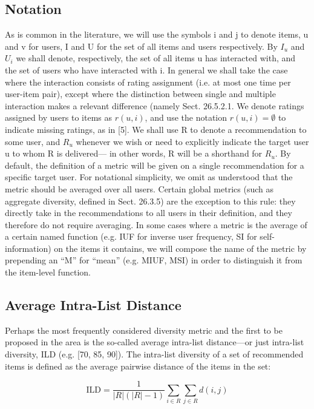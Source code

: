 \subsection{Notation}

As is common in the literature, we will use the symbols i and j to denote items, u and v for users, I and U for the set of all items and users respectively. By $I_u$ and $U_i$ we shall denote, respectively, the set of all items u has interacted with, and the set of users who have interacted with i. In general we shall take the case where the interaction consists of rating assignment (i.e. at most one time per user-item pair), except where the distinction between single and multiple interaction makes a relevant difference (namely Sect. 26.5.2.1. We denote ratings assigned by users to items as $r ( u , i )$, and use the notation $r ( u , i ) = \emptyset$ to indicate missing ratings, as in [5]. We shall use R to denote a recommendation to some user, and $R_u$ whenever we wish or need to explicitly indicate the target user u to whom R is delivered— in other words, R will be a shorthand for $R_u$. By default, the definition of a metric will be given on a single recommendation for a specific target user. For notational simplicity, we omit as understood that the metric should be averaged over all users. Certain global metrics (such as aggregate diversity, defined in Sect. 26.3.5) are the exception to this rule: they directly take in the recommendations to all users in their definition, and they therefore do not require averaging. In some cases where a metric is the average of a certain named function (e.g. IUF for inverse user frequency, SI for self-information) on the items it contains, we will compose the name of the metric by prepending an “M” for “mean” (e.g. MIUF, MSI) in order to distinguish it from the item-level function.

\subsection{Average Intra-List Distance}

Perhaps the most frequently considered diversity metric and the first to be proposed in the area is the so-called average intra-list distance—or just intra-list diversity, ILD (e.g. [70, 85, 90]). The intra-list diversity of a set of recommended items is defined as the average pairwise distance of the items in the set:

$$\mathrm { ILD } = \frac { 1 } { | R | ( | R | - 1 ) } \sum _ { i \in R } \sum _ { j \in R } d ( i , j )$$



